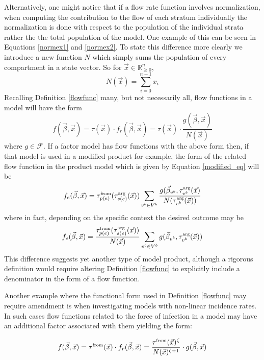 \documentclass{article}
\theoremstyle{definition}
\newcommand{\Rnn}{\mathbb{R}_{\ge 0}}%
\newcommand{\betavec}{\vec{\beta}}
\newcommand{\xvec}{\vec{x}}
\newcommand{\fr}{\ensuremath{\mathcal F}}
\newcommand{\tauf}{\tau^{\mbox{\tiny from}}}
\newcommand{\taua}{\tau^{\mbox{\tiny arg}}}
\begin{document}
Alternatively, one might notice that if a flow rate function involves normalization, when computing the contribution to the flow of each stratum individually the normalization is done with respect to the population of the individual strata rather the the total population of the model. One example of this can be seen in Equations \ref{normex1} and \ref{normex2}. To state this difference more clearly we introduce a new function $N$ which simply sums the population of every compartment in a state vector. So for $\xvec\in \Rnn^n$,
\begin{equation}
    N(\xvec) = \sum\limits_{i=0}^{n-1}x_i
\end{equation}
Recalling Definition \ref{flowfunc} many, but not necessarily all, flow functions in a model will have the form
\begin{equation}
    f(\betavec, \xvec) = \tau(\xvec)\cdot f_r(\betavec, \xvec) = \tau(\xvec) \cdot \frac{g(\betavec, \xvec)}{N(\xvec)}
\end{equation}
where $g\in\fr$. If a factor model has flow functions with the above form then, if that model is used in a modified product for example, the form of the related flow function in the product model which is given by Equation \ref{modified_eq} will be
\begin{equation}
        f_e(\vec{\beta}, \vec{x}) = \tauf_{p(e)}(\taua_{s(e)}(\xvec))\sum\limits_{v^b\in V^b} \frac{g(\betavec_{v^b}, \taua_{v^b}(\xvec)}{N(\taua_{v^b}(\xvec))}
\end{equation}
    where in fact, depending on the specific context the desired outcome may be
\begin{equation}
        f_e(\vec{\beta}, \vec{x}) = \frac{\tauf_{p(e)}(\taua_{s(e)}(\xvec))}{N(\xvec)}\sum\limits_{v^b\in V^b} g(\betavec_{v^b},\taua_{v^b}(\xvec))
\end{equation}
This difference suggests yet another type of model product, although a rigorous definition would require altering Definition \ref{flowfunc} to explicitly include a denominator in the form of a flow function. 

Another example where the functional form used in Definition \ref{flowfunc} may require amendment is when investigating models with non-linear incidence rates. In such cases flow functions related to the force of infection in a model may have an additional factor associated with them yielding the form:

\begin{equation}
    f(\betavec, \xvec) = \tauf(\xvec)\cdot f_r(\betavec, \xvec) = \frac{\tauf(\xvec)^\zeta}{N(\xvec)^{\zeta + 1}} \cdot g(\betavec, \xvec)
\end{equation}
\end{document}

